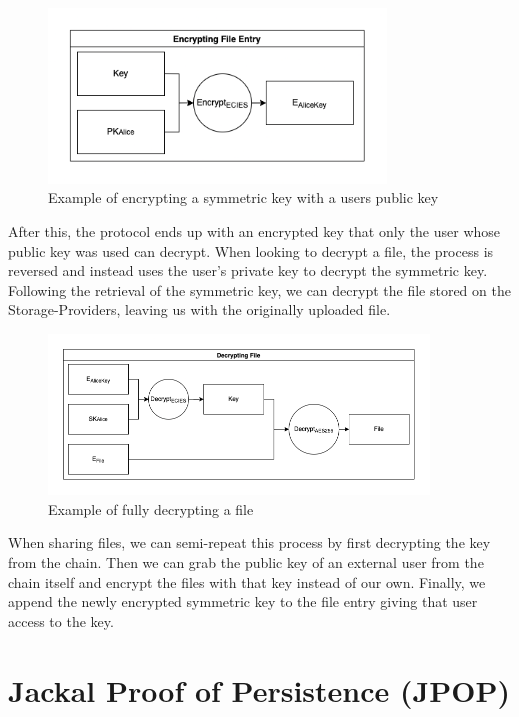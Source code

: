 \documentclass[a4paper]{article}
\begin{document}
\begin{figure}[!htbp]
\centering
\includegraphics[width=0.8\textwidth]{assets/enc2.png}
\caption{Example of encrypting a symmetric key with a users public key}
\end{figure}


After this, the protocol ends up with an encrypted key that only the user whose public key was used can decrypt. When looking to decrypt a file, the process is reversed and instead uses the user's private key to decrypt the symmetric key. Following the retrieval of the symmetric key, we can decrypt the file stored on the Storage-Providers, leaving us with the originally uploaded file.

\begin{figure}[!htbp]
\centering
\includegraphics[width=0.9\textwidth]{assets/enc3.png}
\caption{Example of fully decrypting a file}
\end{figure}

When sharing files, we can semi-repeat this process by first decrypting the key from the chain. Then we can grab the public key of an external user from the chain itself and encrypt the files with that key instead of our own. Finally, we append the newly encrypted symmetric key to the file entry giving that user access to the key.

\section{Jackal Proof of Persistence (JPOP)}
\end{document}
